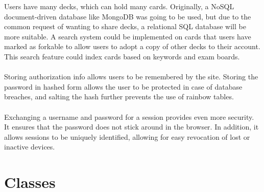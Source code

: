 \documentclass{report}
\begin{document}
Users have many decks, which can hold many cards. Originally, a NoSQL document-driven database like MongoDB was going to be used, but due to the common request of wanting to share decks, a relational SQL database will be more suitable. A search system could be implemented on cards that users have marked as forkable to allow users to adopt a copy of other decks to their account. This search feature could index cards based on keywords and exam boards.

\paragraph{}
Storing authorization info allows users to be remembered by the site. Storing the password in hashed form allows the user to be protected in case of database breaches, and salting the hash further prevents the use of rainbow tables.

\paragraph{}
Exchanging a username and password for a session provides even more security. It ensures that the password does not stick around in the browser. In addition, it allows sessions to be uniquely identified, allowing for easy revocation of lost or inactive devices.

\section{Classes}

\printbibliography
\end{document}
